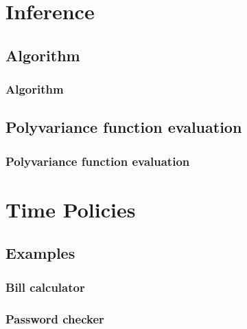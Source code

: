\documentclass[10pt]{beamer}
\begin{document}
\section{Inference}

\subsection{Algorithm}
\begin{frame}
  \frametitle{Algorithm}
  \centering

  \scalebox{.9}{
  
  }
\end{frame}

\subsection{Polyvariance function evaluation}
\begin{frame}
  \frametitle{Polyvariance function evaluation}

\end{frame}

\section{Time Policies}

\subsection{Examples}
\begin{frame}
  \frametitle{Bill calculator}
  \centering

  \scalebox{1}{}
\end{frame}

\begin{frame}
  \frametitle{Password checker}
  \centering

  \scalebox{0.4}{}
\end{frame}
\end{document}
